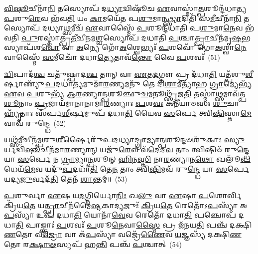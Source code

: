 \-\ul{𑌵𑌿}\-\-\ul{𑌷𑍂}\-𑌚𑍀𑌨𑌾᳴\-\ul{𑌨𑌿} 𑌤𑌸𑍍𑌯𑍋𑌪᳴ 𑌦\-\ul{𑌧𑍍𑌯𑌾}\-𑌦𑍍𑌵𑌿𑌷𑍂᳴𑌚 \ul{𑌏}\-𑌵𑌾𑌸𑍍𑌮𑌾॑\-\ul{𑌤𑍍𑌪}\-𑌶𑍂𑌨𑍍𑌦᳴𑌧𑌾𑌤𑍍𑌯\-\ul{𑌪}\-𑌶𑍁\-\ul{𑌰𑍇}\-𑌵 𑌭᳴𑌵\-\ul{𑌤𑌿} 𑌯𑌂 \ul{𑌕𑌾}\-𑌮𑌯𑍇᳴𑌤 𑌪\-\ul{𑌶𑍁}\-𑌮𑌾\-\ul{𑌨𑍍𑌥𑍍𑌸𑍍𑌯𑌾}\-𑌦𑌿𑌤𑌿᳴ 𑌸\-\ul{𑌮𑍀}\-𑌚𑍀𑌨𑌾᳴\-\ul{𑌨𑌿} 𑌤𑌸𑍍𑌯𑍋𑌪᳴ 𑌦𑌧𑍍𑌯𑌾\-\ul{𑌥𑍍𑌸}\-𑌮𑍀𑌚᳴ \ul{𑌏}\-𑌵𑌾𑌸𑍍𑌮𑍈᳴ \ul{𑌪}\-𑌶𑍂𑌨𑍍𑌦᳴𑌧𑌾𑌤𑌿 𑌪\-\ul{𑌶𑍁}\-𑌮𑌾\-\ul{𑌨𑍇}\-𑌵 𑌭᳴𑌵𑌤𑌿 \ul{𑌪𑍁}\-𑌰𑌸𑍍𑌤𑌾॑𑌤𑍍𑌪𑍍𑌰\-\ul{𑌤𑍀}\-𑌚𑍀\-\ul{𑌨}\-𑌮\-\ul{𑌶𑍍𑌵}\-𑌸𑍍𑌯𑍋𑌪᳴ 𑌦𑌧𑌾𑌤𑌿 \ul{𑌪}\-𑌶𑍍𑌚𑌾\-\ul{𑌤𑍍𑌪𑍍𑌰𑌾}\-𑌚𑍀𑌨᳴𑌮𑍃\-\ul{𑌷}\-𑌭𑌸𑍍𑌯𑌾𑌪᳴𑌶\-\ul{𑌵𑍋} 𑌵𑌾 \ul{𑌅}\-𑌨𑍍𑌯𑍇 𑌗𑍋᳴\-\ul{𑌅}\-𑌶𑍍𑌵𑍇𑌭𑍍𑌯𑌃᳴ \ul{𑌪}\-𑌶𑌵𑍋᳴ 𑌗𑍋\-\ul{𑌅}\-𑌶𑍍𑌵𑌾\-\ul{𑌨𑍇}\-𑌵𑌾𑌸𑍍𑌮𑍈᳴ \ul{𑌸}\-𑌮𑍀𑌚𑍋᳴ 𑌦𑌧𑌾\-\ul{𑌤𑍍𑌯𑍇}\-𑌤𑌾𑌵᳴\-\ul{𑌨𑍍𑌤𑍋} 𑌵𑍈 \ul{𑌪}\-𑌶𑌵𑌃᳴~(51)

\-\ul{𑌦𑍍𑌵𑌿}\-𑌪𑌾𑌦᳴\-\ul{𑌶𑍍𑌚} 𑌚𑌤𑍁᳴𑌷𑍍𑌪𑌾𑌦\-\ul{𑌶𑍍𑌚} 𑌤𑌾𑌨𑍍 𑌵𑌾 \ul{𑌏}\-𑌤\-\ul{𑌦}\-𑌗𑍍𑌨𑍗 𑌪𑍍𑌰 𑌦᳴𑌧𑌾\-\ul{𑌤𑌿} 𑌯𑌤𑍍𑌪᳴𑌶𑍁\-\ul{𑌶𑍀}\-𑌰𑍍\mbox{}𑌷𑌾𑌣𑍍𑌯𑍁᳴\-\ul{𑌪}\-𑌦𑌧𑌾॑\-\ul{𑌤𑍍𑌯}\-𑌮𑍁𑌮𑌾᳴\-\ul{𑌰}\-𑌣𑍍𑌯𑌮𑌨𑍁᳴ 𑌤𑍇 𑌦𑌿\-\ul{𑌶𑌾}\-𑌮𑍀𑌤𑍍𑌯𑌾᳴𑌹 \ul{𑌗𑍍𑌰𑌾}\-𑌮𑍍𑌯𑍇𑌭𑍍𑌯᳴ \ul{𑌏}\-𑌵 \ul{𑌪}\-𑌶𑍁𑌭𑍍𑌯᳴ 𑌆\-\ul{𑌰}\-𑌣𑍍𑌯𑌾\-\ul{𑌨𑍍𑌪}\-𑌶𑍂𑌞𑍍𑌛𑍁\-\ul{𑌚}\-𑌮𑌨𑍂𑌥𑍍𑌸𑍃᳴𑌜\-\ul{𑌤𑌿} 𑌤𑌸𑍍𑌮𑌾॑\-\ul{𑌥𑍍𑌸}\-𑌮𑌾𑌵᳴𑌤𑍍𑌪\-\ul{𑌶𑍂}\-𑌨𑌾𑌂 \ul{𑌪𑍍𑌰}\-𑌜𑌾𑌯᳴𑌮𑌾𑌨𑌾𑌨𑌾𑌮𑌾\-\ul{𑌰}\-𑌣𑍍𑌯𑌾𑌃 \ul{𑌪}\-𑌶\-\ul{𑌵𑌃} 𑌕𑌨𑍀᳴𑌯𑌾𑍞𑌸𑌃 \ul{𑌶𑍁}\-𑌚𑌾 𑌹𑍍𑌯𑍃᳴𑌤𑌾𑌃 𑌸᳴𑌰𑍍𑌪\-\ul{𑌶𑍀}\-𑌰𑍍\mbox{}𑌷𑌮𑍁𑌪᳴ 𑌦𑌧𑌾\-\ul{𑌤𑌿} 𑌯𑍈𑌵 \ul{𑌸}\-𑌰𑍍𑌪𑍇 𑌤𑍍𑌵𑌿\-\ul{𑌷𑌿}\-𑌸𑍍𑌤𑌾\-\ul{𑌮𑍇}\-𑌵𑌾𑌵᳴ 𑌰𑍁𑌨𑍍𑌦𑍍𑌧𑍇~(52)

𑌯𑌥𑍍𑌸᳴\-\ul{𑌮𑍀}\-𑌚𑍀𑌨᳴𑌮𑍍𑌪𑌶𑍁\-\ul{𑌶𑍀}\-𑌰𑍍\mbox{}𑌷𑍈𑌰𑍁᳴𑌪\-\ul{𑌦}\-𑌧𑍍𑌯𑌾\-\ul{𑌦𑍍𑌗𑍍𑌰𑌾}\-𑌮𑍍𑌯𑌾\-\ul{𑌨𑍍𑌪}\-𑌶𑍂𑌨𑍍𑌦𑍞𑌶𑍁᳴𑌕𑌾𑌃 \ul{𑌸𑍍𑌯𑍁}\-𑌰𑍍𑌯𑌦𑍍𑌵𑌿᳴\-\ul{𑌷𑍂}\-𑌚𑍀𑌨᳴𑌮𑌾\-\ul{𑌰}\-𑌣𑍍𑌯𑌾𑌨𑍍 𑌯𑌜𑍁᳴\-\ul{𑌰𑍇}\-𑌵 𑌵᳴\-\ul{𑌦𑍇}\-𑌦\-\ul{𑌵} 𑌤𑌾𑌂 𑌤𑍍𑌵𑌿𑌷𑌿𑍞᳴ 𑌰𑍁\-\ul{𑌨𑍍𑌦𑍍𑌧𑍇} 𑌯𑌾 \ul{𑌸}\-𑌰𑍍𑌪𑍇 𑌨 \ul{𑌗𑍍𑌰𑌾}\-𑌮𑍍𑌯𑌾\-\ul{𑌨𑍍𑌪}\-𑌶𑍂𑌨𑍍 \ul{𑌹𑌿}\-𑌨\-\ul{𑌸𑍍𑌤𑌿} 𑌨𑌾\-\ul{𑌰}\-𑌣𑍍𑌯𑌾𑌨\-\ul{𑌥𑍋} 𑌖𑌲𑍂᳴\-\ul{𑌪}\-𑌧𑍇𑌯᳴\-\ul{𑌮𑍇}\-𑌵 𑌯𑌦𑍁᳴\-\ul{𑌪}\-𑌦𑌧𑌾᳴\-\ul{𑌤𑌿} 𑌤𑍇\-\ul{𑌨} 𑌤𑌾𑌂 𑌤𑍍𑌵𑌿\-\ul{𑌷𑌿}\-𑌮𑌵᳴ 𑌰𑍁\-\ul{𑌨𑍍𑌦𑍍𑌧𑍇} 𑌯𑌾 \ul{𑌸}\-𑌰𑍍𑌪𑍇 𑌯𑌦𑍍𑌯\-\ul{𑌜𑍁}\-𑌰𑍍𑌵𑌦᳴\-\ul{𑌤𑌿} 𑌤𑍇𑌨᳴ \ul{𑌶𑌾}\-𑌨𑍍𑌤𑌮𑍍॥~(53)

{\anuvakamend[{\-\ul{𑌊}\-𑌨𑌾𑌨𑍍𑌤𑌸𑍍𑌯𑍋𑌪᳴ \ul{𑌪𑍍𑌰𑌾}\-𑌣𑌾𑌃 \ul{𑌸𑍍𑌯𑌾}\-𑌦𑌿\-\ul{𑌤𑌿} 𑌵𑍈 \ul{𑌪}\-𑌶𑌵𑍋᳴ 𑌰𑍁\-\ul{𑌨𑍍𑌧𑍇} 𑌚𑌤𑍁᳴𑌶𑍍𑌚𑌤𑍍𑌵𑌾𑌰𑌿𑍞𑌶𑌚𑍍𑌚}]}%

\-\ul{𑌪}\-𑌶𑍁𑌰𑍍𑌵𑌾 \ul{𑌏}\-𑌷 𑌯\-\ul{𑌦}\-𑌗𑍍𑌨𑌿𑌰𑍍𑌯𑍋\-\ul{𑌨𑌿𑌃} 𑌖\-\ul{𑌲𑍁} 𑌵𑌾 \ul{𑌏}\-𑌷𑌾 \ul{𑌪}\-𑌶𑍋𑌰𑍍𑌵𑌿 𑌕𑍍𑌰𑌿᳴𑌯\-\ul{𑌤𑍇} 𑌯\-\ul{𑌤𑍍𑌪𑍍𑌰𑌾}\-𑌚𑍀𑌨᳴𑌮𑍈\-\ul{𑌷𑍍𑌟}\-𑌕𑌾𑌦𑍍𑌯𑌜𑍁𑌃᳴ \ul{𑌕𑍍𑌰𑌿}\-𑌯\-\ul{𑌤𑍇} 𑌰𑍇𑌤𑍋᳴\-𑌽\-\ul{𑌪}\-𑌸𑍍𑌯𑌾᳴ 𑌅\-\ul{𑌪}\-𑌸𑍍𑌯𑌾᳴ 𑌉𑌪᳴ 𑌦𑌧𑌾\-\ul{𑌤𑌿} 𑌯𑍋𑌨𑌾᳴\-\ul{𑌵𑍇}\-𑌵 𑌰𑍇𑌤𑍋᳴ 𑌦𑌧𑌾\-\ul{𑌤𑌿} 𑌪𑌞𑍍𑌚𑍋𑌪᳴ 𑌦𑌧𑌾\-\ul{𑌤𑌿} 𑌪𑌾𑌙𑍍𑌕𑍍𑌤𑌾𑌃॑ \ul{𑌪}\-𑌶𑌵𑌃᳴ \ul{𑌪}\-𑌶𑍂\-\ul{𑌨𑍇}\-𑌵𑌾\-\ul{𑌸𑍍𑌮𑍈} 𑌪𑍍𑌰 𑌜᳴𑌨𑌯\-\ul{𑌤𑌿} 𑌪𑌞𑍍𑌚᳴ 𑌦𑌕𑍍𑌷𑌿\-\ul{𑌣}\-𑌤𑍋 𑌵\-\ul{𑌜𑍍𑌰𑍋} 𑌵𑌾 𑌅᳴\-\ul{𑌪}\-𑌸𑍍𑌯𑌾᳴ 𑌵𑌜𑍍𑌰𑍇᳴\-\ul{𑌣𑍈}\-𑌵 \ul{𑌯}\-𑌜𑍍𑌞𑌸𑍍𑌯᳴ 𑌦𑌕𑍍𑌷𑌿\-\ul{𑌣}\-𑌤𑍋 𑌰\-\ul{𑌕𑍍𑌷𑌾}\-\-\ul{𑍟}\-𑌸𑍍𑌯𑌪᳴ 𑌹\-\ul{𑌨𑍍𑌤𑌿} 𑌪𑌞𑍍𑌚᳴ \ul{𑌪}\-𑌶𑍍𑌚𑌾𑌤𑍍~(54)

